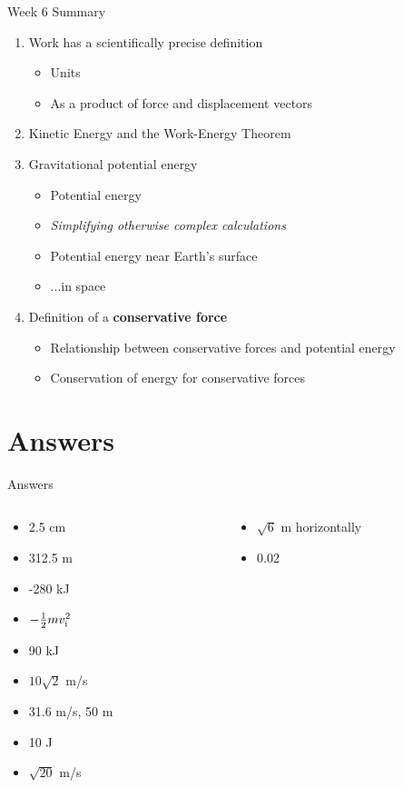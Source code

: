 \documentclass{beamer}
\begin{document}
\begin{frame}{Week 6 Summary}
\begin{enumerate}
\item \alert{Work} has a scientifically precise definition
\begin{itemize}
\item Units
\item As a product of force and displacement vectors
\end{itemize}
\item Kinetic Energy and the \alert{Work-Energy Theorem}
\item Gravitational potential energy
\begin{itemize}
\item Potential energy
\item \textit{Simplifying otherwise complex calculations}
\item Potential energy near Earth's surface
\item ...in space
\end{itemize}
\item Definition of a \textbf{conservative force}
\begin{itemize}
\item Relationship between conservative forces and potential energy
\item Conservation of energy for conservative forces
\end{itemize}
\end{enumerate}
\end{frame}

\section{Answers}

\begin{frame}{Answers}
\begin{columns}[T]
\begin{column}{0.5\textwidth}
\begin{itemize}
\item 2.5 cm
\item 312.5 m
\item -280 kJ
\item $-\frac{1}{2} m v_{\rm i}^2$
\item 90 kJ
\item $10\sqrt{2}$ m/s
\item 31.6 m/s, 50 m
\item 10 J
\item $\sqrt{20}$ m/s
\end{itemize}
\end{column}
\begin{column}{0.5\textwidth}
\begin{itemize}
\item $\sqrt{6}$ m horizontally
\item 0.02
\end{itemize}
\end{column}
\end{columns}
\end{frame}
\end{document}
